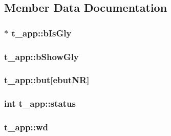 \subsection{\-Member \-Data \-Documentation}
\hypertarget{structt__app_a95179fd244eecdacd9ddefb7812c63dd}{
\subsubsection[{b\-Is\-Gly}]{$\ast$ {\bf t\-\_\-app\-::b\-Is\-Gly}}}\label{structt__app_a95179fd244eecdacd9ddefb7812c63dd}
\hypertarget{structt__app_a3031690cacedb62decff61cc1f6e1477}{
\subsubsection[{b\-Show\-Gly}]{ {\bf t\-\_\-app\-::b\-Show\-Gly}}}\label{structt__app_a3031690cacedb62decff61cc1f6e1477}
\hypertarget{structt__app_acff391c03a72b5f2666a3e559c90bfb1}{
\subsubsection[{but}]{ {\bf t\-\_\-app\-::but}\mbox{[}{\bf ebut\-N\-R}\mbox{]}}}\label{structt__app_acff391c03a72b5f2666a3e559c90bfb1}
\hypertarget{structt__app_ad5b1d949670fd928b0906cf62f8b5564}{
\subsubsection[{status}]{\setlength{\rightskip}{0pt plus 5cm}int {\bf t\-\_\-app\-::status}}}\label{structt__app_ad5b1d949670fd928b0906cf62f8b5564}
\hypertarget{structt__app_a889fe7c38e922c9e02944f716df2b884}{
\subsubsection[{wd}]{ {\bf t\-\_\-app\-::wd}}}\label{structt__app_a889fe7c38e922c9e02944f716df2b884}
